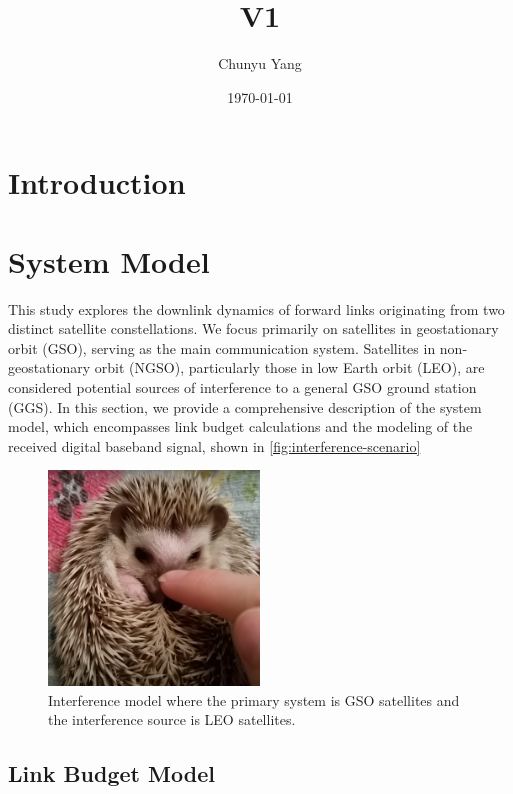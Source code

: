 \documentclass[12pt]{article}
\title{V1}
\author{Chunyu Yang}
\date{\today}
\begin{document}
\maketitle

\section{Introduction}

\section{System Model}

This study explores the downlink dynamics of forward links originating from two distinct satellite constellations. We focus primarily on satellites in geostationary orbit (GSO), serving as the main communication system. Satellites in non-geostationary orbit (NGSO), particularly those in low Earth orbit (LEO), are considered potential sources of interference to a general GSO ground station (GGS). In this section, we provide a comprehensive description of the system model, which encompasses link budget calculations and the modeling of the received digital baseband signal, shown in \autoref{fig:interference-scenario}

\begin{figure}[htbp]
    \centering
    \includegraphics[width=0.5\textwidth]{dummy.png}
    \caption{Interference model where the primary system is GSO satellites and the interference source is LEO satellites.}
    \label{fig:interference-scenario}
\end{figure}

\subsection{Link Budget Model}
\end{document}
